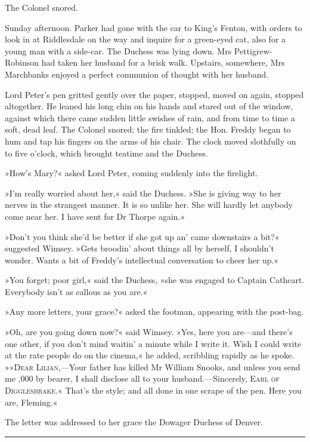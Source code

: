 The Colonel snored.

Sunday afternoon. Parker had gone with the car to King's Fenton, with orders to look in at Riddlesdale on the way and inquire for a green-eyed cat, also for a young man with a side-car. The Duchess was lying down. Mrs Pettigrew-Robinson had taken her husband for a brisk walk. Upstairs, somewhere, Mrs Marchbanks enjoyed a perfect communion of thought with her husband.

Lord Peter's pen gritted gently over the paper, stopped, moved on again, stopped altogether. He leaned his long chin on his hands and stared out of the window, against which there came sudden little swishes of rain, and from time to time a soft, dead leaf. The Colonel snored; the fire tinkled; the Hon. Freddy began to hum and tap his fingers on the arms of his chair. The clock moved slothfully on to five o'clock, which brought teatime and the Duchess.

»How's Mary?« asked Lord Peter, coming suddenly into the firelight.

»I'm really worried about her,« said the Duchess. »She is giving way to her nerves in the strangest manner. It is so unlike her. She will hardly let anybody come near her. I have sent for Dr Thorpe again.«

»Don't you think she'd be better if she got up an' came downstairs a bit?« suggested Wimsey. »Gets broodin' about things all by herself, I shouldn't wonder. Wants a bit of Freddy's intellectual conversation to cheer her up.«

»You forget; poor girl,« said the Duchess, »she was engaged to Captain Cathcart. Everybody isn't as callous as you are.«

»Any more letters, your grace?« asked the footman, appearing with the post-bag.

»Oh, are you going down now?« said Wimsey. »Yes, here you are\allowbreak---\allowbreak and there's one other, if you don't mind waitin' a minute while I write it. Wish I could write at the rate people do on the cinema,« he added, scribbling rapidly as he spoke. »»\textsc{Dear Lilian},---Your father has killed Mr William Snooks, and unless you send me ,000 by bearer, I shall disclose all to your husband.---Sincerely, \textsc{Earl of Digglesbrake}.« That's the style; and all done in one scrape of the pen. Here you are, Fleming.«

The letter was addressed to her grace the Dowager Duchess of Denver.

\noindent\hfil\rule{0.5\textwidth}{.4pt}\hfil

